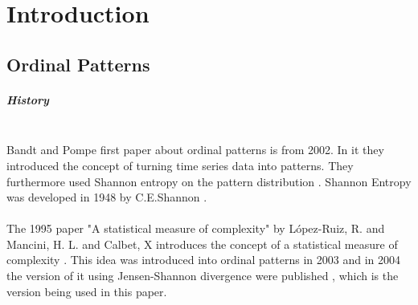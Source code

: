 
\chapter{Introduction}
\section{Ordinal Patterns}
\paragraph{History}\\
Bandt and Pompe first paper about ordinal patterns is from 2002. In it they introduced the concept of turning time series data into patterns. They furthermore used Shannon entropy on the pattern distribution \cite{Bandt2002}. Shannon Entropy was developed in 1948 by C.E.Shannon \cite{Shannon1948}. 
\\\\
The 1995 paper "A statistical measure of complexity" by López-Ruiz, R. and Mancini, H. L. and Calbet, X introduces the concept of a statistical measure of complexity 
 \cite{LopezRuiz1995}. This idea was introduced into ordinal patterns in 2003 \cite{Martin2003} and in 2004 the version of it using Jensen-Shannon divergence were published \cite{Lamberti2004}, which is the version being used in this paper.

